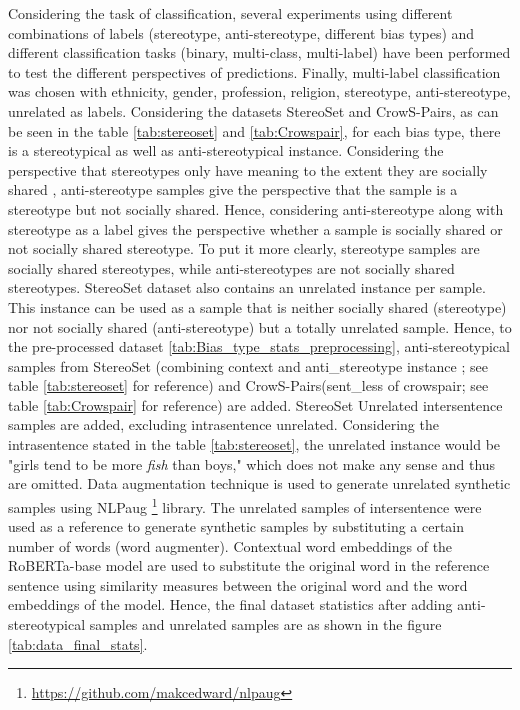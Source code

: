 Considering the task of classification, several experiments using different combinations of labels (stereotype, anti-stereotype, different bias types) and different classification tasks (binary, multi-class, multi-label) have been performed to test the different perspectives of predictions. Finally, multi-label classification was chosen with ethnicity, gender, profession, religion, stereotype, anti-stereotype, unrelated as labels. Considering the datasets StereoSet and CrowS-Pairs, as can be seen in the table \ref{tab:stereoset} and \ref{tab:Crowspair}, for each bias type, there is a stereotypical as well as anti-stereotypical instance. Considering the perspective that stereotypes only have meaning to the extent they are socially shared \cite{macrae1996stereotypes}, anti-stereotype samples give the perspective that the sample is a stereotype but not socially shared. Hence, considering anti-stereotype along with stereotype as a label gives the perspective whether a sample is socially shared or not socially shared stereotype. To put it more clearly, stereotype samples are socially shared stereotypes, while anti-stereotypes are not socially shared stereotypes. StereoSet dataset also contains an unrelated instance per sample. This instance can be used as a sample that is neither socially shared (stereotype) nor not socially shared (anti-stereotype) but a totally unrelated sample. Hence, to the pre-processed dataset \ref{tab:Bias_type_stats_preprocessing}, anti-stereotypical samples from StereoSet (combining context and anti\_stereotype instance ; see table \ref{tab:stereoset} for reference) and CrowS-Pairs(sent\_less of crowspair; see table \ref{tab:Crowspair} for reference) are added. StereoSet Unrelated intersentence samples are added, excluding intrasentence unrelated. Considering the intrasentence stated in the table \ref{tab:stereoset}, the unrelated instance would be "girls tend to be more \textit{fish} than boys," which does not make any sense and thus are omitted. Data augmentation technique is used to generate unrelated synthetic samples using NLPaug \footnote{\url{https://github.com/makcedward/nlpaug}} library. The unrelated samples of intersentence were used as a reference to generate synthetic samples by substituting a certain number of words (word augmenter). Contextual word embeddings of the RoBERTa-base model are used to substitute the original word in the reference sentence using similarity measures between the original word and the word embeddings of the model. Hence, the final dataset statistics after adding anti-stereotypical samples and unrelated samples are as shown in the figure \ref{tab:data_final_stats}.

